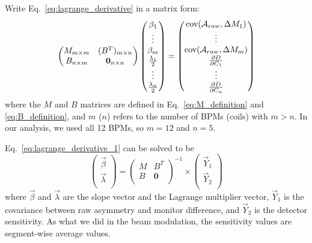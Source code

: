 Write Eq.~\ref{eq:lagrange_derivative} in a matrix form:
\begin{equation}
    \begin{pmatrix}
	M_{m\times m}	& (B^T)_{m\times n}	\\
	B_{n \times m}  & \bm{0}_{n\times n}   \\
    \end{pmatrix}
    \begin{pmatrix}
	\beta_1	\\
	\vdots	\\
	\beta_m	\\
	\frac{\lambda_1}{2} \\
	\vdots	\\
	\frac{\lambda_n}{2} \\
    \end{pmatrix}
    =
    \begin{pmatrix}
	\text{cov}(\mathcal{A}_{raw}, \Delta M_1)  \\
	\vdots	\\
	\text{cov}(\mathcal{A}_{raw}, \Delta M_m)  \\
	\frac{\partial D}{\partial C_1}	\\
	\vdots	\\
	\frac{\partial D}{\partial C_n}	\\
    \end{pmatrix}
    \label{eq:lagrange_derivative_1}
\end{equation}
where the $M$ and $B$ matrices are defined in Eq.~\ref{eq:M_definition} and \ref{eq:B_definition},
and $m$ ($n$) refers to the number of BPMs (coils) with $m > n$.
In our analysis, we used all 12 BPMs, so $m = 12$ and $n = 5$.

Eq.~\ref{eq:lagrange_derivative_1} can be solved to be
\begin{equation}
    \begin{pmatrix}
	\vec{\beta} \\
	\vec{\lambda}	\\
    \end{pmatrix}
    =
    \begin{pmatrix}
	M   & B^T   \\
	B   & \bm{0}	\\
    \end{pmatrix}^{-1}
    \times
    \begin{pmatrix}
	\vec{Y}_1   \\
	\vec{Y}_2   \\
    \end{pmatrix}
\end{equation}
where $\vec{\beta}$ and $\vec{\lambda}$ are the slope vector and the Lagrange multiplier vector,
$\vec{Y}_1$ is the covariance between raw asymmetry and monitor difference, 
and $\vec{Y}_2$ is the detector sensitivity. As what we did in the beam modulation, 
the sensitivity values are segment-wise average values.

